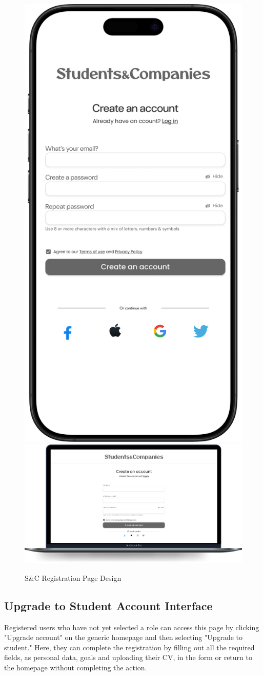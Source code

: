 \begin{figure}[H]
    \centering
    \includegraphics[width=0.2\linewidth]{Images/Mock-up/RegistrationMobile.png}
    \includegraphics[width=0.75\linewidth]{Images/Mock-up/RegistrationPagePC.png}
    \caption{S\&C Registration Page Design}
    \label{fig:homepage-design}
\end{figure}

\subsection{Upgrade to Student Account Interface}

Registered users who have not yet selected a role can access this page by clicking "Upgrade account" on the generic homepage and then selecting "Upgrade to student." Here, they can complete the registration by filling out all the required fields, as personal data, goals and uploading their CV, in the form or return to the homepage without completing the action. \\

